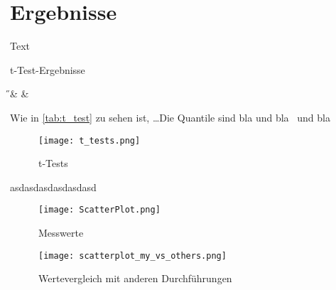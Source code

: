 
\newpage
\section{Ergebnisse} %
    \label{sec:ergebnisse}
    Text

    \begin{table}[h]
        \centering
        \caption{t-Test-Ergebnisse}
        \label{tab:t_test}
        {\H & \pH & \NaCl}
    \end{table}
    Wie in \autoref{tab:t_test} zu sehen ist, \dots Die Quantile sind bla und bla\ \cite[vgl.][]{web:t-values} und bla\ \cite[vgl.][]{web:Gartenratgeber}\\

    \begin{figure}[ht]
        \texttt{[image: t\_tests.png]}
        \caption{t-Tests}
        \label{fig:t_tests}
    \end{figure}
    asdasdasdasdasdasd\newpage

    \begin{figure}[ht]
        \texttt{[image: ScatterPlot.png]}
        \caption{Messwerte}
        \label{fig:scat_plot}
    \end{figure}\newpage

    \begin{figure}[ht]
        \texttt{[image: scatterplot\_my\_vs\_others.png]}
        \caption{Wertevergleich mit anderen Durchführungen}
        \label{fig:scat_plot_cmp}
    \end{figure}
